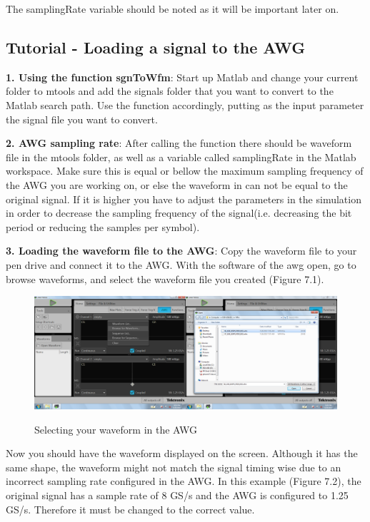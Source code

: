 The samplingRate variable  should be noted as it will be important later on.

\subsection*{Tutorial - Loading a signal to the AWG}

\textbf{1. Using the function sgnToWfm}: 
Start up Matlab and change your current folder to mtools and add the signals folder that you want to convert to the Matlab search path. Use the function accordingly, putting as the input parameter the signal file you want to convert.
\bigskip

\noindent
\textbf{2. AWG sampling rate}: 
After calling the function there should be waveform file in the mtools folder, as well as a variable called samplingRate in the Matlab workspace. Make sure this is equal or bellow the maximum sampling frequency of the AWG you are working on, or else the waveform in can not be equal to the original signal. If it is higher you  have to adjust the parameters in the simulation in order to decrease the sampling frequency of the signal(i.e. decreasing the bit period or reducing the samples per symbol).
\bigskip

\noindent
\textbf{3. Loading the waveform file to the AWG}:
Copy the waveform file to your pen drive and connect it to the AWG. With the software of the awg open, go to browse waveforms, and select the waveform file you created (Figure 7.1).

\begin{figure}[h]
	\centering
	\includegraphics[width=\textwidth]{../mtools/sgnToWfm/figures/tutorial1}
	\label{TUT_SelectingWFM}\caption{Selecting your waveform in the AWG}
\end{figure}
Now you should have the waveform displayed on the screen. Although it has the same shape,  the waveform might not match the signal timing wise due to an incorrect sampling rate  configured in the AWG. 
In this example (Figure 7.2), the original signal has a sample rate of 8 GS/s and the AWG is configured to 1.25 GS/s. Therefore it must be changed to the correct value.

